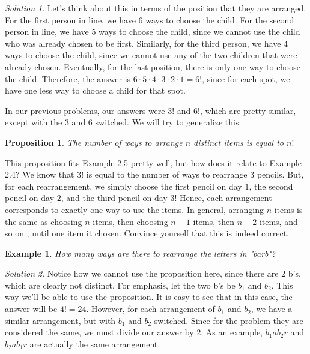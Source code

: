 \documentclass[letterpaper]{article}
\newtheorem{prop}[thm]{Proposition}
\newtheorem{example}[thm]{Example}
\theoremstyle{remark}
\newtheorem*{solution}{Solution}
\theoremstyle{definition}
\begin{document}
\begin{solution}

Let's think about this in terms of the position that they are arranged. For the first person in line, we have $6$ ways to choose the child. For the second person in line, we have $5$ ways to choose the child, since we cannot use the child who was already chosen to be first. Similarly, for the third person, we have $4$ ways to choose the child, since we cannot use any of the two children that were already chosen. Eventually, for the last position, there is only one way to choose the child. Therefore, the answer is $6\cdot 5\cdot 4\cdot 3\cdot 2\cdot 1=6!$, since for each spot, we have one less way to choose a child for that spot.
\end{solution}



In our previous problems, our answers were $3!$ and $6!$, which are pretty similar, except with the $3$ and $6$ switched. We will try to generalize this.

\begin{prop}
The number of ways to arrange $n$ distinct items is equal to $n!$
\end{prop}

This proposition fits Example 2.5 pretty well, but how does it relate to Example 2.4? We know that $3!$ is equal to the number of ways to rearrange $3$ pencils. But, for each rearrangement, we simply choose the first pencil on day $1$, the second pencil on day $2$, and the third pencil on day $3$! Hence, each arrangement corresponds to exactly one way to use the items. In general, arranging $n$ items is the same as choosing $n$ items, then choosing $n-1$ items, then $n-2$ items, and so on , until one item it chosen. Convince yourself that this is indeed correct. 
\newline

\begin{example}
How many ways are there to rearrange the letters in "barb"?
\end{example}

\begin{solution}
Notice how we cannot use the proposition here, since there are $2$ b's, which are clearly not distinct. For emphasis, let the two b's be $b_1$ and $b_2$. This way we'll be able to use the proposition. It is easy to see that in this case, the answer will be $4!=24$. However, for each arrangement of $b_1$ and $b_2$, we have a similar arrangement, but with $b_1$ and $b_2$ switched. Since for the problem they are considered the same, we must divide our answer by $2$. As an example, $b_1 a b_2 r$ and $b_2 a b_1 r$ are actually the same arrangement.
\end{solution}
\end{document}
